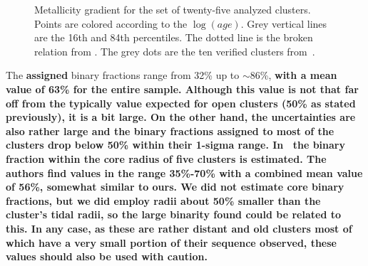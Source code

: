 \documentclass[referee]{aa}
\begin{document}
  \begin{figure}
   \caption{Metallicity gradient for the set of twenty-five analyzed clusters.
   Points are colored according to the $\log(age)$. Grey vertical lines are the
   16th and 84th percentiles. The dotted line is the broken relation from 
   \citet[][Fig 7]{Donor_2020}. The grey dots are the ten verified clusters
   from~\cite{Perren_2020}.}
   \label{fig:met_gradient}
  \end{figure}




  The \textbf{assigned} binary fractions range from 32\% up to $\sim86$\%, 
  \textbf{with a mean value of 63\% for the entire sample. Although this value
  is not that far off from the typically value expected for open clusters (50\%
  as stated previously), it is a bit large. On the other hand, the
  uncertainties are also rather large and the binary fractions assigned to
  most of the clusters drop below 50\% within their 1-sigma range.
  In~\cite{Sollima_2010} the binary fraction within the core radius of five
  clusters is estimated. The authors find values in the range 35\%-70\% with a
  combined mean value of 56\%, somewhat similar to ours. We did not estimate
  core binary fractions, but we did employ radii about 50\% smaller than the
  cluster's tidal radii, so the large binarity found could be related to this.
  In any case, as these are rather distant and old clusters most of which have
  a very small portion of their sequence observed, these values should also be
  used with caution.}\\
\end{document}
